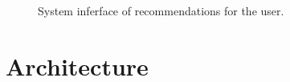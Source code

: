\begin{figure}
\centering
{}
\caption{System inferface of recommendations for the user.}
\label{fig:recom}    
\end{figure}

\section{Architecture} 

